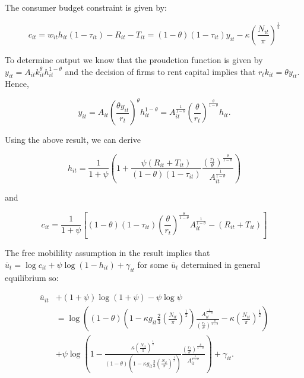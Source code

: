 The consumer budget constraint is given by:

\begin{equation*}
    c_{it} = w_{it} h_{it} (1 - \tau_{it}) - R_{it} - T_{it} = (1 - \theta) (1 - \tau_{it}) y_{it} - \kappa (\frac{N_{it}}{\pi})^{\frac{1}{2}}
\end{equation*}

To determine output we know that the proudction function is given by $y_{it} = A_{it} k_{it}^{\theta} h_{it}^{1 - \theta}$ and the decision of firms to rent capital implies that $r_t k_{it} = \theta y_{it}$. Hence,

\begin{equation*}
    y_{it} = A_{it} (\frac{\theta y_{it}}{r_t})^{\theta} h_{it}^{1 - \theta} = A_{it}^{\frac{1}{1 - \theta}} (\frac{\theta}{r_t})^{\frac{\theta}{1 - \theta}} h_{it}.
\end{equation*}

Using the above result, we can derive

\begin{equation*}
    h_{it} = \frac{1}{1 + \psi} (1 + \frac{\psi(R_{it} + T_{it})}{(1 - \theta)(1 - \tau_{it})} \frac{(\frac{r_t}{\theta})^{\frac{\theta}{1 - \theta}}}{A_{it}^{\frac{1}{1 - \theta}}})
\end{equation*}

and

\begin{equation*}
    c_{it} = \frac{1}{1 + \psi} \left[(1 - \theta)(1 - \tau_{it}) (\frac{\theta}{r_t})^{\frac{\theta}{1 - \theta}}A_{it}^{\frac{1}{1 - \theta}} - (R_{it} + T_{it})\right]
\end{equation*}

The free mobilility assumption in the result implies that $\overline{u}_t = \log c_{it} + \psi \log(1 - h_{it}) + \gamma_{it}$ for some $\overline{u}_{t}$ determined in general equilibrium so:

\begin{equation}
    \begin{aligned}
        \overline{u}_{it} & + (1 + \psi) \log(1 + \psi) - \psi \log \psi \\
        & = \log \left( (1 - \theta) \left(1 - \kappa g_{it} \frac{2}{3} \left(\frac{N_{it}}{\pi}\right)^{\frac{1}{2}}\right) \frac{A_{it}^{\frac{1}{1 - \theta}}}{\left(\frac{r_t}{\theta}\right)^{\frac{\theta}{1 - \theta}}} - \kappa \left(\frac{N_{it}}{\pi}\right)^{\frac{1}{2}} \right) \\
        & + \psi \log \left( 1 - \frac{\kappa \left(\frac{N_{it}}{\pi}\right)^{\frac{1}{2}}}{(1 - \theta)\left(1 - \kappa g_{it} \frac{2}{3} \left(\frac{N_{it}}{\pi}\right)^{\frac{1}{2}}\right)} \frac{\left(\frac{r_t}{\theta}\right)^{\frac{\theta}{1 - \theta}}}{A_{it}^{\frac{1}{1 - \theta}}} \right) + \gamma_{it}.
    \end{aligned}
\end{equation}

